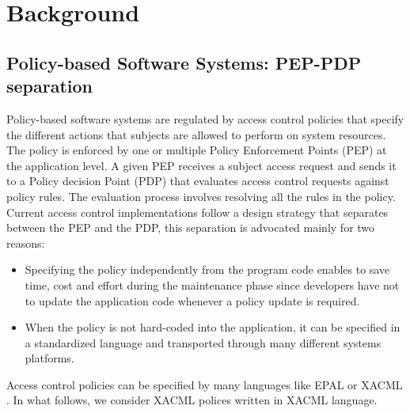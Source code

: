 
  
\section{Background}
\label{sec:background}
\subsection{Policy-based Software Systems: PEP-PDP separation}
Policy-based software systems are regulated by access control policies that specify the different actions that subjects are allowed to perform on system resources. 
The policy is enforced by one or multiple Policy Enforcement Points (PEP) at the application level. A given PEP receives a subject access request and 
sends it to a Policy decision Point (PDP) that evaluates access control requests against policy rules. The evaluation process involves resolving all the rules in the policy. 
Current access control implementations follow a design strategy that separates between the PEP and the PDP, this separation is advocated mainly for two reasons:

\begin{itemize}
\item Specifying the policy independently from the program code enables to save time, cost and effort during the maintenance phase since developers have not 
to update the application code whenever a policy update is required.
\item When the policy is not hard-coded into the application, it can be specified in a standardized language and transported through many different systems platforms.
\end{itemize}

Access control policies can be specified by many languages like EPAL \cite{epal} or XACML \cite {oasis05:xacml}. 
In what follows, we consider XACML polices written in XACML language.




